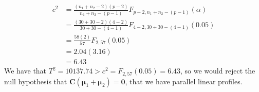 \begin{enumerate}[label= (\alph*)]
    \begin{align*}
        c^{2}
        & =
        \frac{(n_{1} + n_{2} - 2)(p-2)}{n_{1} + n_{2} - (p - 1)}
        F_{p-2, n_{1} + n_{2} - (p - 1)}
        (\alpha)
        \\
        & =
        \frac{(30 + 30 - 2)(4-2)}{30 + 30 - (4 - 1)}
        F_{4-2, 30 + 30 - (4 - 1)}
        (0.05)
        \\
        & =
        \frac{58(2)}{57}
        F_{2, 57}
        (0.05)
        \\
        & =
        2.04(3.16)
        \\
        & =
        6.43
    \end{align*}
    We have that $T^{2} = 10137.74 > c^{2} = F_{2, 57}(0.05) = 6.43$, so we would reject the null hypothesis that $\textbf{C}(\bm{\mu}_{1} + \bm{\mu}_{2}) = \textbf{0}$, that we have parallel linear profiles.
\end{enumerate}